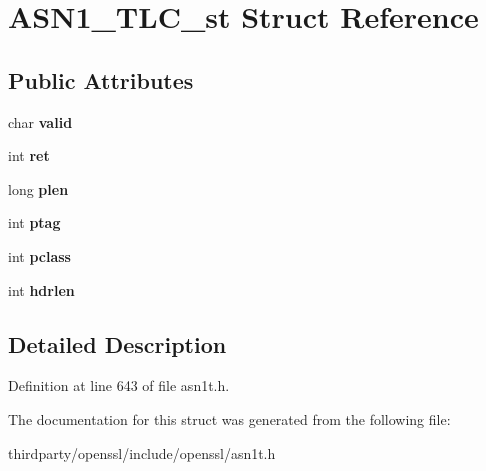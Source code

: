 \hypertarget{struct_a_s_n1___t_l_c__st}{}\section{A\+S\+N1\+\_\+\+T\+L\+C\+\_\+st Struct Reference}
\label{struct_a_s_n1___t_l_c__st}
\subsection*{Public Attributes}
\begin{DoxyCompactItemize}
\item 
\mbox{\label{struct_a_s_n1___t_l_c__st_aae7c516be44ce4351b1d5666ac71ab32}} 
char {\bfseries valid}
\item 
\mbox{\label{struct_a_s_n1___t_l_c__st_afea043db523f6ea0ca08eb16668f4992}} 
int {\bfseries ret}
\item 
\mbox{\label{struct_a_s_n1___t_l_c__st_af587b734c7de4809c665bce45fc2b66a}} 
long {\bfseries plen}
\item 
\mbox{\label{struct_a_s_n1___t_l_c__st_a58cd31917a573675361476d87346549a}} 
int {\bfseries ptag}
\item 
\mbox{\label{struct_a_s_n1___t_l_c__st_a33e7ac01afc4ecad3cf6d6d6d8f929f5}} 
int {\bfseries pclass}
\item 
\mbox{\label{struct_a_s_n1___t_l_c__st_aea820e4a42d10f37f8e095af41e0067a}} 
int {\bfseries hdrlen}
\end{DoxyCompactItemize}


\subsection{Detailed Description}


Definition at line 643 of file asn1t.\+h.



The documentation for this struct was generated from the following file\+:\begin{DoxyCompactItemize}
\item 
thirdparty/openssl/include/openssl/asn1t.\+h\end{DoxyCompactItemize}

